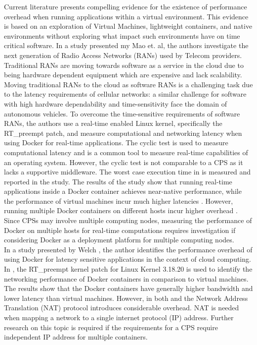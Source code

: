 Current literature \cite{p6} presents compelling evidence for the existence of performance overhead when running applications within a virtual environment. This evidence is based on an exploration of Virtual Machines, lightweight containers, and native environments without exploring what impact such environments have on time critical software. In a study presented my Mao et. al, the authors investigate the next generation of Radio Access Networks (RANs) used by Telecom providers. Traditional RANs are moving towards software as a service in the cloud \cite{p1} due to being hardware dependent equipment which are expensive and lack scalability. Moving traditional RANs to the cloud as software RANs is a challenging task due to the latency requirements of cellular networks: a similar challenge for software with high hardware dependability and time-sensitivity face the domain of autonomous vehicles. To overcome the time-sensitive requirements of software RANs, the authors use a real-time enabled Linux kernel, specifically the RT\_preempt patch, and measure computational and networking latency when using Docker for real-time applications. The cyclic test \cite{cycl} is used to measure computational latency and is a common tool to measure real-time capabilities of an operating system. However, the cyclic test is not comparable to a CPS as it lacks a supportive middleware. The worst case execution time in \cite{p1} is measured and reported in the study. The results of the study show that running real-time applications inside a Docker container achieves near-native performance, while the performance of virtual machines incur much higher latencies \cite{p1}. However, running multiple Docker containers on different hosts incur higher overhead \cite{p1}. Since CPSs may involve multiple computing nodes, measuring the performance of Docker on multiple hosts for real-time computations requires investigation if considering Docker as a deployment platform for multiple computing nodes.  \\

In a study presented by Welch \cite{c2}, the author identifies the performance overhead of using Docker for latency sensitive applications in the context of cloud computing. In \cite{c2}, the RT\_preempt kernel patch for Linux Kernel 3.18.20 is used to identify the networking performance of Docker containers in comparison to virtual machines. The results show that the Docker containers have generally higher bandwidth and lower latency than virtual machines. However, in both \cite{Andreas} and \cite{p6} the Network Address Translation (NAT) protocol introduces considerable overhead. NAT is needed when mapping a network to a single internet protocol (IP) address. Further research on this topic is required if the requirements for a CPS require independent IP address for multiple containers. \\


